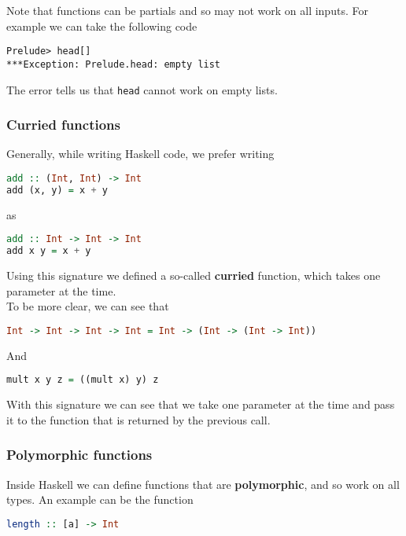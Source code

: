 Note that functions can be partials and so may not work on all inputs. For example we can take the following code

\begin{lstlisting}
Prelude> head[]
***Exception: Prelude.head: empty list
\end{lstlisting}

The error tells us that \texttt{head} cannot work on empty lists.

\subsubsection{Curried functions}
Generally, while writing Haskell code, we prefer writing

\begin{lstlisting}[language=haskell]
add :: (Int, Int) -> Int
add (x, y) = x + y
\end{lstlisting}

as 

\begin{lstlisting}[language=haskell]
add :: Int -> Int -> Int
add x y = x + y
\end{lstlisting}

Using this signature we defined a so-called \textbf{curried} function, which takes one parameter at the time. \\
To be more clear, we can see that

\begin{lstlisting}[language=haskell]
Int -> Int -> Int -> Int = Int -> (Int -> (Int -> Int))
\end{lstlisting}

And 

\begin{lstlisting}[language=haskell]
mult x y z = ((mult x) y) z
\end{lstlisting}

With this signature we can see that we take one parameter at the time and pass it to the function that is returned by the previous call. \\

\subsubsection{Polymorphic functions}
Inside Haskell we can define functions that are \textbf{polymorphic}, and so work on all types. An example can be the function

\begin{lstlisting}[language=haskell]
length :: [a] -> Int
\end{lstlisting}

